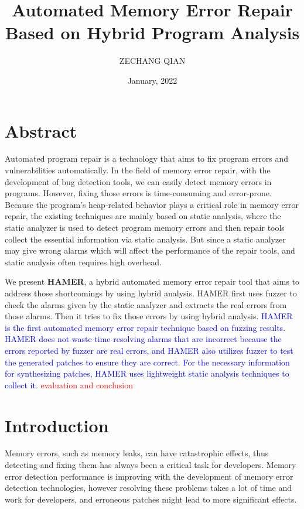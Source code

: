 \documentclass[a4paper,11pt,oneside,openany]{book}
\title{Automated Memory Error Repair\\Based on Hybrid Program Analysis}
\author{ZECHANG QIAN}
\affiliation{%
  Graduate Major in Computer Science\\
  School of Computing\\
  Tokyo Institute of Technology}
\date{January, 2022}
\begin{document}
\frontmatter
\maketitle

\chapter{Abstract}
Automated program repair is a technology that aims to fix program errors and vulnerabilities automatically. In the field of memory error repair, with the development of bug detection tools, we can easily detect memory errors in programs. However, fixing those errors is time-consuming and error-prone. Because the program’s heap-related behavior plays a critical role in memory error repair, the existing techniques are mainly based on static analysis, where the static analyzer is used to detect program memory errors and then repair tools collect the essential information via static analysis. But since a static analyzer may give wrong alarms which will affect the performance of the repair tools, and static analysis often requires high overhead. 

We present \textbf{HAMER}, a hybrid automated memory error repair tool that aims to address those 
shortcomings by using hybrid analysis. HAMER first uses fuzzer to check the alarms given by the static 
analyzer and extracts the real errors from those alarms. Then it tries to fix those errors by using 
hybrid analysis. \textcolor{blue}{HAMER is the first automated memory error repair technique based on fuzzing results. HAMER does not waste time resolving alarms that are incorrect because the errors reported by fuzzer are real errors, and HAMER also utilizes fuzzer to test the generated patches to ensure they are correct. For the necessary information for synthesizing patches, HAMER uses lightweight static analysis techniques to collect it.} \textcolor{red}{evaluation and conclusion}


\tableofcontents
\listoffigures
\listoftables


\mainmatter
\chapter{Introduction}
Memory errors, such as memory leaks, can have catastrophic effects,  thus detecting and fixing them has always been a critical task for developers. Memory error detection performance is improving with the development of memory error detection technologies, however resolving these problems takes a lot of time and work for developers, and erroneous patches might lead to more significant effects.
\end{document}

